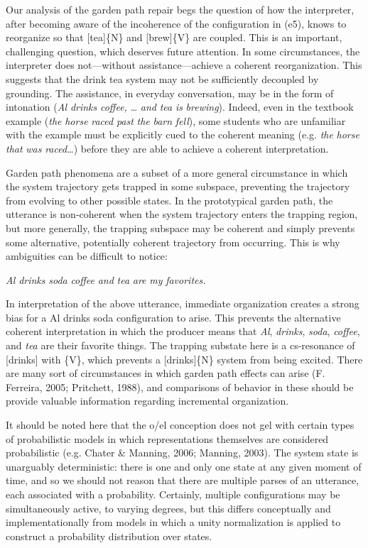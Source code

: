   Our analysis of the garden path repair begs the question of how the interpreter, after becoming aware of the incoherence of the configuration in (e5), knows to reorganize so that [tea]\{N\} and [brew]\{V\} are coupled. This is an important, challenging question, which deserves future attention. In some circumstances, the interpreter does not—without assistance—achieve a coherent reorganization. This suggests that the {\textbar}drink tea{\textbar} system may not be sufficiently decoupled by grounding. The assistance, in everyday conversation, may be in the form of intonation (\textit{Al} \textit{drinks} \textit{coffee,} \textit{…} \textit{and} \textit{tea} \textit{is} \textit{brewing}). Indeed, even in the textbook example (\textit{the} \textit{horse} \textit{raced} \textit{past} \textit{the} \textit{barn} \textit{fell}), some students who are unfamiliar with the example must be explicitly cued to the coherent meaning (e.g. \textit{the} \textit{horse} \textit{that} \textit{was} \textit{raced…}) before they are able to achieve a coherent interpretation. 

  Garden path phenomena are a subset of a more general circumstance in which the system trajectory gets trapped in some subspace, preventing the trajectory from evolving to other possible states. In the prototypical garden path, the utterance is non-coherent when the system trajectory enters the trapping region, but more generally, the trapping subspace may be coherent and simply prevents some alternative, potentially coherent trajectory from occurring. This is why ambiguities can be difficult to notice:

    \textit{Al} \textit{drinks} \textit{soda} \textit{coffee} \textit{and} \textit{tea} \textit{are} \textit{my} \textit{favorites.}

  In interpretation of the above utterance, immediate organization creates a strong bias for a {\textbar}Al drinks soda{\textbar} configuration to arise. This prevents the alternative coherent interpretation in which the producer means that \textit{Al}, \textit{drinks}, \textit{soda}, \textit{coffee}, and \textit{tea} are their favorite things. The trapping substate here is a cs-resonance of [drinks] with \{V\}, which prevents a [drinks]\{N\} system from being excited. There are many sort of circumstances in which garden path effects can arise (F. Ferreira, 2005; Pritchett, 1988), and comparisons of behavior in these should be provide valuable information regarding incremental organization. 

  It should be noted here that the o/el conception does not gel with certain types of probabilistic models in which representations themselves are considered probabilistic (e.g. Chater \& Manning, 2006; Manning, 2003). The system state is unarguably deterministic: there is one and only one state at any given moment of time, and so we should not reason that there are multiple parses of an utterance, each associated with a probability. Certainly, multiple configurations may be simultaneously active, to varying degrees, but this differs conceptually and implementationally from models in which a unity normalization is applied to construct a probability distribution over states.

